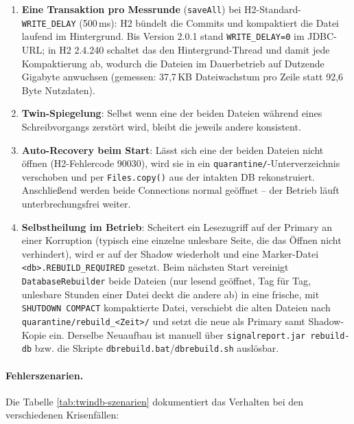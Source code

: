 \begin{enumerate}
  \item \textbf{Eine Transaktion pro Messrunde} (\texttt{saveAll}) bei H2-Standard-%
    \texttt{WRITE\_DELAY} (500\,ms): H2 bündelt die Commits und kompaktiert die Datei
    laufend im Hintergrund. Bis Version 2.0.1 stand \texttt{WRITE\_DELAY=0} im JDBC-URL;
    in H2 2.4.240 schaltet das den Hintergrund-Thread und damit jede Kompaktierung ab,
    wodurch die Dateien im Dauerbetrieb auf Dutzende Gigabyte anwuchsen (gemessen:
    37,7\,KB Dateiwachstum pro Zeile statt 92,6\,Byte Nutzdaten).
  \item \textbf{Twin-Spiegelung}: Selbst wenn eine der beiden Dateien während eines
    Schreibvorgangs zerstört wird, bleibt die jeweils andere konsistent.
  \item \textbf{Auto-Recovery beim Start}: Lässt sich eine der beiden Dateien nicht öffnen
    (H2-Fehlercode 90030), wird sie in ein \texttt{quarantine/}-Unterverzeichnis verschoben
    und per \texttt{Files.copy()} aus der intakten DB rekonstruiert. Anschließend werden beide
    Connections normal geöffnet -- der Betrieb läuft unterbrechungsfrei weiter.
  \item \textbf{Selbstheilung im Betrieb}: Scheitert ein Lesezugriff auf der Primary an einer
    Korruption (typisch eine einzelne unlesbare Seite, die das Öffnen nicht verhindert), wird
    er auf der Shadow wiederholt und eine Marker-Datei \texttt{<db>.REBUILD\_REQUIRED} gesetzt.
    Beim nächsten Start vereinigt \texttt{DatabaseRebuilder} beide Dateien (nur lesend geöffnet,
    Tag für Tag, unlesbare Stunden einer Datei deckt die andere ab) in eine frische, mit
    \texttt{SHUTDOWN COMPACT} kompaktierte Datei, verschiebt die alten Dateien nach
    \texttt{quarantine/rebuild\_<Zeit>/} und setzt die neue als Primary samt Shadow-Kopie ein.
    Derselbe Neuaufbau ist manuell über \texttt{signalreport.jar rebuild-db} bzw. die
    Skripte \texttt{dbrebuild.bat}/\texttt{dbrebuild.sh} auslösbar.
\end{enumerate}

\paragraph{Fehlerszenarien.} Die Tabelle \ref{tab:twindb-szenarien} dokumentiert das
Verhalten bei den verschiedenen Krisenfällen:

